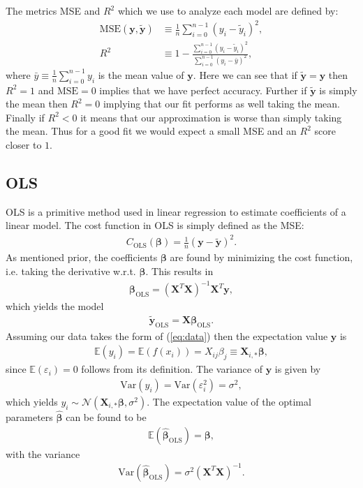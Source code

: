 \documentclass[%
reprint,
amsmath,amssymb,
aps,
pra,
]{revtex4-2}
\newcommand{\f}[2]{\frac{#1}{#2}}
\begin{document}
The metrics MSE and $R^2$ which we use to analyze each model are defined by:
\begin{align}
	\text{MSE}(\bm y,\tilde{\bm{y}})&\equiv\frac{1}{n}\sum_{i=0}^{n-1}(y_i-\tilde y_i)^2,\\
	R^2&\equiv1-\frac{\sum_{i=0}^{n-1}(y_i-\tilde y_i)^2}{\sum_{i=0}^{n-1}(y_i-\bar y)^2},
\end{align}
where $\bar y\equiv\frac{1}{n}\sum_{i=0}^{n-1}y_i$ is the mean value of $\bm y$. Here we can see that if $\tilde{\bm{y}}=\bm y$ then $R^2=1$ and $\text{MSE}=0$ implies that we have perfect accuracy. Further if $\tilde{\bm{y}}$ is simply the mean then $R^2=0$ implying that our fit performs as well taking the mean. Finally if $R^2<0$ it means that our approximation is worse than simply taking the mean. Thus for a good fit we would expect a small MSE and an $R^2$ score closer to $1$.

\subsection{OLS}
\label{sec:THEORY_OLS}
OLS is a primitive method used in linear regression to estimate coefficients of a linear model. The cost function in OLS is simply defined as the MSE:
\begin{align}
	C_\text{OLS}(\bm\beta)=\f1n(\bm y-\tilde{\bm y})^2.
	\label{eq:cost_ols}
\end{align}
As mentioned prior, the coefficients $\bm\beta$ are found by minimizing the cost function, i.e. taking the derivative w.r.t. $\bm\beta$. This results in
\begin{align}
	\bm\beta_\text{OLS}=(\bm X^T\bm X)^{-1}\bm X^T\bm y,
	\label{eq:beta_ols}
\end{align}
which yields the model
\begin{align}
	\tilde{\bm y}_\text{OLS}=\bm X\bm \beta_\text{OLS}.
\end{align}
Assuming our data takes the form of (\ref{eq:data}) then the expectation value $\bm y$ is
\begin{align*}
	\mathbb{E}(y_i)=\mathbb{E}(f(x_i))=X_{ij}\beta_j\equiv\bm X_{i,*}\bm\beta,
\end{align*}
since $\mathbb{E}(\varepsilon_i)=0$ follows from its definition. The variance of $\bm y$ is given by
\begin{align*}
	\text{Var}(y_i)=\text{Var}(\varepsilon_i^2)=\sigma^2,
\end{align*}
which yields $y_i\sim\mathcal{N}(\bm X_{i,*}\bm\beta,\sigma^2)$. The expectation value of the optimal parameters $\hat{\bm\beta}$ can be found to be
\begin{align*}
	\mathbb{E}(\hat{\bm\beta}_\text{OLS})=\bm\beta,
\end{align*}
with the variance
\begin{align*}
	\text{Var}(\hat{\bm\beta}_\text{OLS})=\sigma^2(\bm X^T \bm X)^{-1}.
\end{align*}
\end{document}
